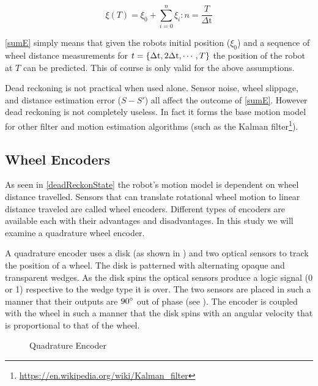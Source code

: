 \documentclass[main.tex]{subfiles}
\begin{document}
\begin{equation}
\label{eq:sumE}
\xi(T) = \xi_0 + \sum^{n}_{i=0} \xi_{i} : n = \frac{T}{\Delta\mathrm{t}}
\end{equation}

\eqref{sumE} simply means that given the robots initial position ($\xi_0$) and a sequence
of wheel distance measurements for $t=\{\Delta\mathrm{t},2\Delta\mathrm{t},\cdots,T\}$ the position of
the robot at $T$ can be predicted. This of course is only valid for the above
assumptions.


Dead reckoning is not practical when used alone. Sensor noise, wheel slippage,
and distance estimation error ($S-S\mathrm{'}$) all affect the outcome of
\eqref{sumE}. However dead reckoning is not completely useless. In fact it forms
the base motion model for other filter and motion estimation algorithms (such as
the Kalman filter\footnote{\url{https://en.wikipedia.org/wiki/Kalman_filter}}).

\subsection{Wheel Encoders}

As seen in \eqref{deadReckonState} the robot's motion model is dependent on
wheel distance travelled. Sensors that can translate rotational wheel motion to
linear distance traveled are called wheel encoders. Different types of encoders
are available each with their advantages and disadvantages. In this study we
will examine a quadrature wheel encoder. 

A quadrature encoder uses a disk (as shown in ) and two
optical sensors to track the position of a wheel. The disk is patterned with
alternating opaque and transparent wedges. As the disk spins the optical sensors
produce a logic signal (0 or 1) respective to the wedge type it is over. The two
sensors are placed in such a manner that their outputs are $90^\circ$ out of
phase (see ). The encoder is coupled with the wheel in such a
manner that the disk spins with an angular velocity that is proportional to that
of the wheel.

\begin{figure}[h]
	\begin{center}
	
	\end{center}
	\caption{Quadrature Encoder}
	\label{fig:quadEncode}
\end{figure}
\end{document}
